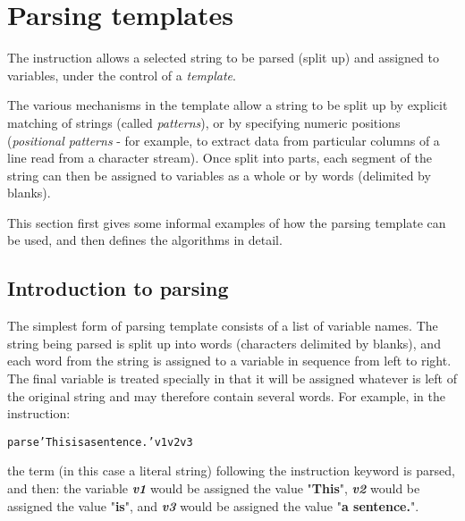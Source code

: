\chapter{Parsing templates}\label{refparsing}
 The  instruction allows a selected string to
be parsed (split up) and assigned to variables, under the control of a
\emph{template}.
 
The various mechanisms in the template allow a string to be split up by
explicit matching of strings (called \emph{patterns}), or by
specifying numeric positions (\emph{positional patterns} - for
example, to extract data from particular columns of a line read from a
character stream).
Once split into parts, each segment of the string can then be assigned
to variables as a whole or by words (delimited by blanks).
 
This section first gives some informal examples of how the parsing
template can be used, and then defines the algorithms in detail.
\section{Introduction to parsing}\label{parseintro}
 The simplest form of parsing template consists of a list of variable
names.
The string being parsed is split up into words (characters delimited by
blanks), and each word from the string is assigned to a
variable in sequence from left to right.
The final variable is treated specially in that it will be assigned
whatever is left of the original string and may therefore contain
several words.
For example, in the  instruction:
\begin{alltt}
parse 'This is a sentence.' v1 v2 v3
\end{alltt}
the term (in this case a literal string) following the instruction
keyword is parsed, and then:  the variable \textbf{\emph{v1}}
would be assigned the value "\textbf{This}", \textbf{\emph{v2}}
would be assigned the value "\textbf{is}",
and \textbf{\emph{v3}} would be assigned the
value "\textbf{a sentence.}".
 
